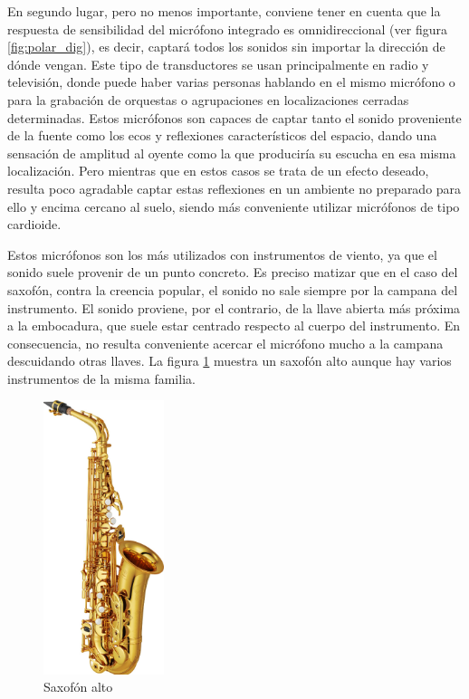 En segundo lugar, pero no menos importante, conviene tener en cuenta que la respuesta de sensibilidad del micrófono integrado es omnidireccional (ver figura \ref{fig:polar_dig}), es decir, captará todos los sonidos sin importar la dirección de dónde vengan. Este tipo de transductores se usan principalmente en radio y televisión, donde puede haber varias personas hablando en el mismo micrófono o para la grabación de orquestas o agrupaciones en localizaciones cerradas determinadas. Estos micrófonos son capaces de captar tanto el sonido proveniente de la fuente como los ecos y reflexiones característicos del espacio, dando una sensación de amplitud al oyente como la que produciría su escucha en esa misma localización. Pero mientras que en estos casos se trata de un efecto deseado, resulta poco agradable captar estas reflexiones en un ambiente no preparado para ello y encima cercano al suelo, siendo más conveniente utilizar micrófonos de tipo cardioide.

Estos micrófonos son los más utilizados con instrumentos de viento, ya que el sonido suele provenir de un punto concreto. Es preciso matizar que en el caso del saxofón, contra la creencia popular, el sonido no sale siempre por la campana del instrumento. El sonido proviene, por el contrario, de la llave abierta más próxima a la embocadura, que suele estar centrado respecto al cuerpo del instrumento. En consecuencia, no resulta conveniente acercar el micrófono mucho a la campana descuidando otras llaves. La figura \ref{fig:saxo} muestra un saxofón alto aunque hay varios instrumentos de la misma familia.

\begin{figure}[!b]
\begin{center}
\includegraphics[height=8cm]{img/saxo.png}
\caption{\label{fig:saxo}Saxofón alto}
\end{center}
\end{figure}

